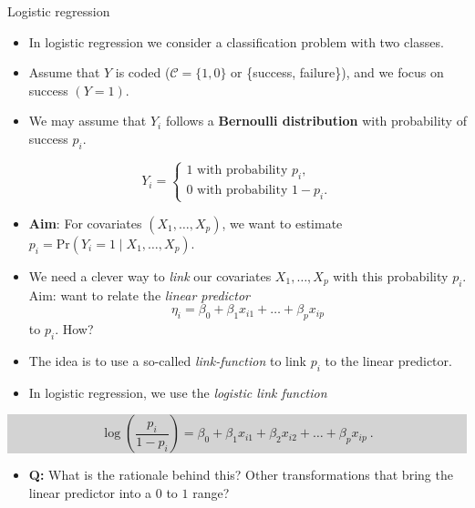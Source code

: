 \documentclass[10pt,ignorenonframetext,]{beamer}
\providecommand{\tightlist}{%
  \setlength{\itemsep}{0pt}\setlength{\parskip}{0pt}}
\begin{document}
\begin{frame}{Logistic regression}

\begin{itemize}
\item
  In logistic regression we consider a classification problem with two
  classes.
\item
  Assume that \(Y\) is coded (\(\mathcal{C} = \{1, 0\}\) or \{success,
  failure\}), and we focus on success \((Y=1)\).
\item
  We may assume that \(Y_i\) follows a \textbf{Bernoulli distribution}
  with probability of success \(p_i\).
\end{itemize}

\[Y_i = \begin{cases} 1 \text{ with probability } p_i, \\ 0 \text{ with probability } 1-p_i. \end{cases}\]

\begin{itemize}
\tightlist
\item
  \textbf{Aim}: For covariates \((X_1,\ldots,X_p)\), we want to estimate
  \(p_i = \text{Pr}(Y_i=1 \mid X_1,\ldots,X_p)\).
\end{itemize}

\end{frame}

\begin{frame}

\begin{itemize}
\item
  We need a clever way to \emph{link} our covariates
  \(X_1, \ldots, X_p\) with this probability \(p_i\). Aim: want to
  relate the \emph{linear predictor}
  \[\eta_i = \beta_0 + \beta_1 x_{i1} + \ldots + \beta_p x_{ip}\] to
  \(p_i\). How?
\item
  The idea is to use a so-called \emph{link-function} to link \(p_i\) to
  the linear predictor.
\item
  In logistic regression, we use the \emph{logistic link function}
\end{itemize}

\begin{center}
\colorbox{lightgray}{\begin{minipage}{10cm}
\begin{equation}
\log\left( \frac{p_i}{1-p_i} \right) = \beta_0 + \beta_1 x_{i1} + \beta_2 x_{i2} + \ldots + \beta_p x_{ip} \ .
\end{equation}
\end{minipage}}
\end{center}

\begin{itemize}
\tightlist
\item
  \textbf{Q:} What is the rationale behind this? Other transformations
  that bring the linear predictor into a \(0\) to \(1\) range?
\end{itemize}

\end{frame}
\end{document}
